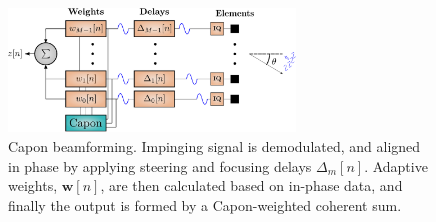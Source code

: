 \documentclass[journal]{IEEEtran}
\newcommand{\mat}[1]{\mathbf{#1}}
\renewcommand{\vec}[1]{\mathbf{#1}}
\begin{document}

\begin{figure}
\centerline{\includegraphics[width=3in]{gfx/beamforming_mv.eps}}
\caption{Capon beamforming. Impinging signal is demodulated, and aligned in phase by applying steering and focusing delays $\Delta_m[n]$. Adaptive weights, $\vec{w}[n]$, are then calculated based on in-phase data, and finally the output is formed by a Capon-weighted coherent sum.}
\label{fig:mvbf}
\end{figure}
\end{document}
